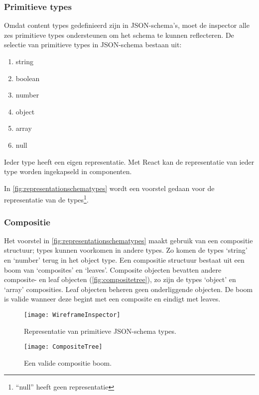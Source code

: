 \subsubsection{Primitieve types}
Omdat content types gedefinieerd zijn in JSON-schema’s, moet de inspector alle zes primitieve types\cite{Droettboom2016} ondersteunen om het schema te kunnen reflecteren. De selectie van primitieve types in JSON-schema bestaan uit:

\begin{enumerate}
    \item string
    \item boolean
    \item number
    \item object
    \item array
    \item null
\end{enumerate}

\noindent Ieder type heeft een eigen representatie. Met React kan de representatie van ieder type worden ingekapseld in componenten.

In \autoref{fig:representationschematypes} wordt een voorstel gedaan voor de representatie van de types\footnote{“null” heeft geen representatie}.

\subsubsection{Compositie}
Het voorstel in \autoref{fig:representationschematypes} maakt gebruik van een compositie structuur; types kunnen voorkomen in andere types. Zo komen de types ‘string’ en ‘number’ terug in het object type. Een compositie structuur bestaat uit een boom van ‘composites’ en ‘leaves’. Composite objecten bevatten andere composite- en leaf objecten (\autoref{fig:compositetree}), zo zijn de types ‘object’ en ‘array’ composities. Leaf objecten beheren geen onderliggende objecten. De boom is valide wanneer deze begint met een composite en eindigt met leaves.

\begin{figure}[H]
    \centering
    \begin{minipage}{.5\textwidth}
        \centering
        \texttt{[image: WireframeInspector]}
        \caption{Representatie van primitieve JSON-schema types.}
        \label{fig:representationschematypes}    
    \end{minipage}%
    \begin{minipage}{.5\textwidth}
        \centering
        \texttt{[image: CompositeTree]}
        \caption{Een valide compositie boom.}
        \label{fig:compositetree}
    \end{minipage}
\end{figure}

